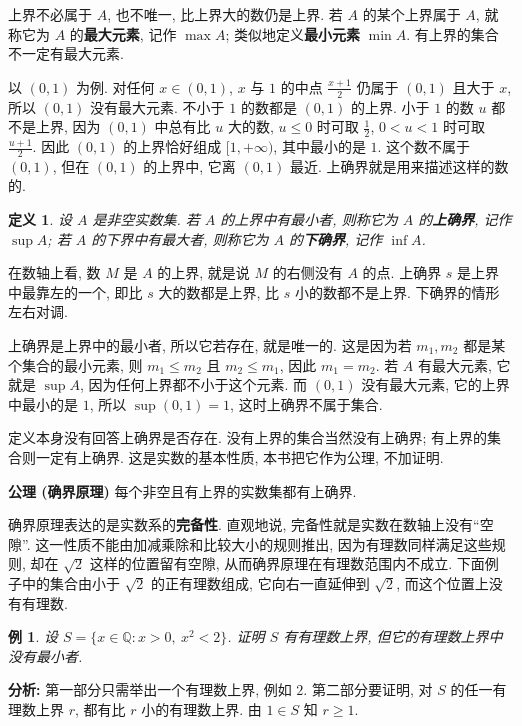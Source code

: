 \documentclass[UTF8,openany]{ctexbook}
\theoremstyle{chinesetextbook}
\newtheorem{definition}{定义}[section]
\newtheorem{example}{例}[section]
\begin{document}
上界不必属于 $A$, 也不唯一, 比上界大的数仍是上界. 若 $A$ 的某个上界属于 $A$, 就称它为 $A$ 的\textbf{最大元素}, 记作 $\max A$; 类似地定义\textbf{最小元素} $\min A$. 有上界的集合不一定有最大元素.

以 $(0,1)$ 为例. 对任何 $x\in(0,1)$, $x$ 与 $1$ 的中点 $\displaystyle\frac{x+1}2$ 仍属于 $(0,1)$ 且大于 $x$, 所以 $(0,1)$ 没有最大元素. 不小于 $1$ 的数都是 $(0,1)$ 的上界. 小于 $1$ 的数 $u$ 都不是上界, 因为 $(0,1)$ 中总有比 $u$ 大的数, $u\le0$ 时可取 $\displaystyle\frac12$, $0<u<1$ 时可取 $\displaystyle\frac{u+1}2$. 因此 $(0,1)$ 的上界恰好组成 $[1,+\infty)$, 其中最小的是 $1$. 这个数不属于 $(0,1)$, 但在 $(0,1)$ 的上界中, 它离 $(0,1)$ 最近. 上确界就是用来描述这样的数的.
\begin{definition}
设 $A$ 是非空实数集. 若 $A$ 的上界中有最小者, 则称它为 $A$ 的\textbf{上确界}, 记作 $\sup A$; 若 $A$ 的下界中有最大者, 则称它为 $A$ 的\textbf{下确界}, 记作 $\inf A$.
\end{definition}
在数轴上看, 数 $M$ 是 $A$ 的上界, 就是说 $M$ 的右侧没有 $A$ 的点. 上确界 $s$ 是上界中最靠左的一个, 即比 $s$ 大的数都是上界, 比 $s$ 小的数都不是上界. 下确界的情形左右对调.

上确界是上界中的最小者, 所以它若存在, 就是唯一的. 这是因为若 $m_1,m_2$ 都是某个集合的最小元素, 则 $m_1\le m_2$ 且 $m_2\le m_1$, 因此 $m_1=m_2$. 若 $A$ 有最大元素, 它就是 $\sup A$, 因为任何上界都不小于这个元素. 而 $(0,1)$ 没有最大元素, 它的上界中最小的是 $1$, 所以 $\sup(0,1)=1$, 这时上确界不属于集合.

定义本身没有回答上确界是否存在. 没有上界的集合当然没有上确界; 有上界的集合则一定有上确界. 这是实数的基本性质, 本书把它作为公理, 不加证明.

\par\indent\textbf{公理 (确界原理)} 每个非空且有上界的实数集都有上确界.

确界原理表达的是实数系的\textbf{完备性}. 直观地说, 完备性就是实数在数轴上没有“空隙”. 这一性质不能由加减乘除和比较大小的规则推出, 因为有理数同样满足这些规则, 却在 $\sqrt2$ 这样的位置留有空隙, 从而确界原理在有理数范围内不成立. 下面例子中的集合由小于 $\sqrt2$ 的正有理数组成, 它向右一直延伸到 $\sqrt2$, 而这个位置上没有有理数.
\begin{example}
设 $S=\{x\in\mathbb Q:x>0,\ x^2<2\}$. 证明 $S$ 有有理数上界, 但它的有理数上界中没有最小者.
\end{example}
\par\indent\textbf{分析:} 第一部分只需举出一个有理数上界, 例如 $2$. 第二部分要证明, 对 $S$ 的任一有理数上界 $r$, 都有比 $r$ 小的有理数上界. 由 $1\in S$ 知 $r\ge1$.
\end{document}
